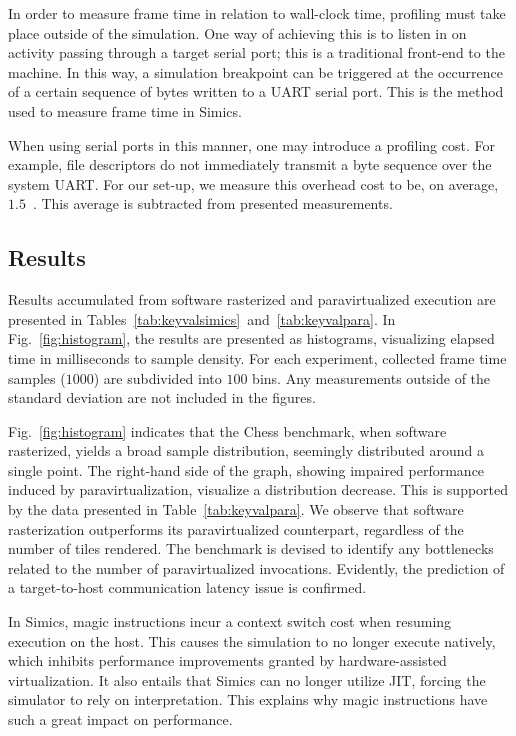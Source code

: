 In order to measure frame time in relation to wall-clock time, profiling must take place outside of the simulation.
One way of achieving this is to listen in on activity passing through a target serial port; this is a traditional front-end to the machine.
In this way, a simulation breakpoint can be triggered at the occurrence of a certain sequence of bytes written to a UART serial port.
This is the method used to measure frame time in Simics.

When using serial ports in this manner, one may introduce a profiling cost.
For example, file descriptors do not immediately transmit a byte sequence over the system UART.
For our set-up, we measure this overhead cost to be, on average, $1.5$~\milli\second .
This average is subtracted from presented measurements.

\subsection{Results}
\label{sec:results}
Results accumulated from software rasterized and paravirtualized execution are presented in Tables~\ref{tab:keyvalsimics}~and~\ref{tab:keyvalpara}.
In Fig.~\ref{fig:histogram}, the results are presented as histograms, visualizing elapsed time in milliseconds to sample density.
For each experiment, collected frame time samples ($1000$) are subdivided into $100$ bins.
Any measurements outside of the standard deviation are not included in the figures.

Fig.~\ref{fig:histogram} indicates that the Chess benchmark, when software rasterized, yields a broad sample distribution, seemingly distributed around a single point.
The right-hand side of the graph, showing impaired performance induced by paravirtualization, visualize a distribution decrease.
This is supported by the data presented in Table~\ref{tab:keyvalpara}.
We observe that software rasterization outperforms its paravirtualized counterpart, regardless of the number of tiles rendered.
The benchmark is devised to identify any bottlenecks related to the number of paravirtualized invocations.
Evidently, the prediction of a target-to-host communication latency issue is confirmed.

In Simics, magic instructions incur a context switch cost when resuming execution on the host.
This causes the simulation to no longer execute natively, which inhibits performance improvements granted by hardware-assisted virtualization.
It also entails that Simics can no longer utilize JIT, forcing the simulator to rely on interpretation.
This explains why magic instructions have such a great impact on performance.

